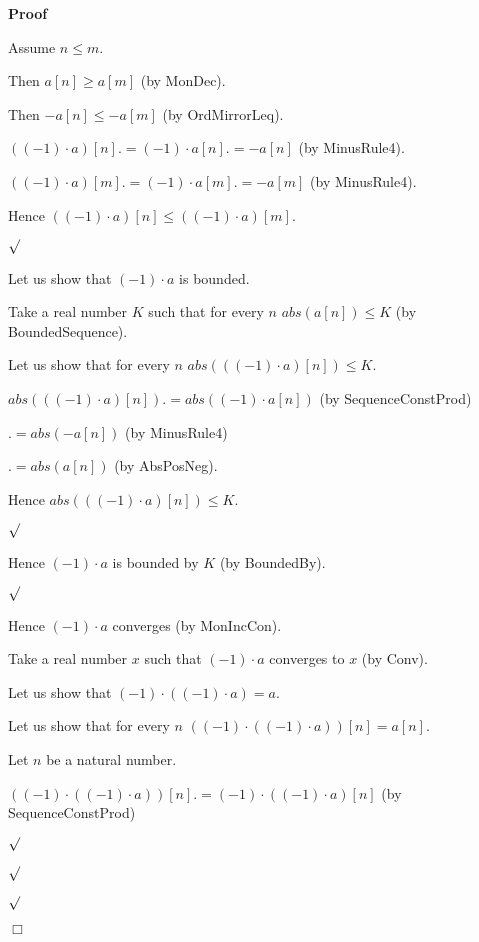 \documentclass{article}
\newenvironment{forthel}{\begin{leftbar}}{\end{leftbar}}
\newenvironment{proof}{\noindent\textbf{Proof\ }}{\hspace*{\fill}$\Box$\medskip}
\newenvironment{subproof}{\begin{list}{}{}
		\item[\text{Proof}]}{\hfill $\surd$ \end{list}}
\newcommand{\cdottwo}{\cdot}
\begin{document}
\begin{forthel}
\begin{proof}
\begin{subproof}
			\begin{subproof}
				Assume $n \leq m$.
				
				Then $a[n] \geq a[m]$ (by MonDec).
				
				Then $-a[n] \leq -a[m]$ (by OrdMirrorLeq).
				
				$((-1) \cdottwo a)[n] .= (-1) \cdot a[n]
				.= -a[n]$ (by MinusRule4).
				
				$((-1) \cdottwo a)[m] .= (-1) \cdot a[m]
				.= -a[m]$ (by MinusRule4).
				
				Hence $((-1) \cdottwo a)[n] \leq ((-1) \cdottwo a)[m]$.
				
			\end{subproof}
			
			Let us show that $(-1) \cdottwo a$ is bounded.
			
			\begin{subproof}
				Take a real number $K$ such that for every $n$ $abs(a[n]) \leq K$ (by BoundedSequence).
				
				Let us show that for every $n$ $abs(((-1) \cdottwo a)[n]) \leq K$.
				
				\begin{subproof}
					$abs(((-1) \cdottwo a)[n]) .= abs((-1) \cdot a[n])$ (by SequenceConstProd)
					
					$.= abs(-a[n])$ (by MinusRule4)
					
					$.= abs(a[n])$ (by AbsPosNeg).
					
					Hence $abs(((-1) \cdottwo a)[n]) \leq K$.
					
				\end{subproof}
				
				Hence $(-1) \cdottwo a$ is bounded by $K$ (by BoundedBy).
				
			\end{subproof}
			
			Hence $(-1) \cdottwo a$ converges (by MonIncCon).
			
			Take a real number $x$ such that $(-1) \cdottwo a$ converges to $x$ (by Conv).
			
			Let us show that $(-1) \cdottwo ((-1) \cdottwo a) = a$.
			
			\begin{subproof}
				Let us show that for every $n$ $((-1) \cdottwo ((-1) \cdottwo a))[n] = a[n]$.
				
				\begin{subproof}
					Let $n$ be a natural number.
					
					$((-1) \cdottwo ((-1) \cdottwo a))[n] .= (-1) \cdot ((-1) \cdottwo a)[n]$ (by SequenceConstProd)
					

\end{subproof}
\end{subproof}
\end{subproof}
\end{proof}
\end{forthel}
\end{document}
